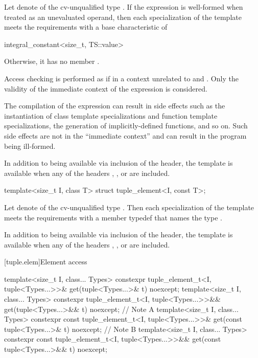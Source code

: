 \begin{itemdescr}
\pnum
Let  denote  of the cv-unqualified type .
If the expression  is well-formed
when treated as an unevaluated operand, then
each specialization of the template meets the  requirements
with a base characteristic of
\begin{codeblock}
integral_constant<size_t, TS::value>
\end{codeblock}
Otherwise, it has no member .

\pnum
Access checking is performed as if in a context
unrelated to  and .
Only the validity of the immediate context of the expression is considered.
\begin{note}
The compilation of the expression can result in side effects
such as the instantiation of class template specializations and
function template specializations, the generation of implicitly-defined functions, and so on.
Such side effects are not in the ``immediate context'' and
can result in the program being ill-formed.
\end{note}

\pnum
In addition to being available via inclusion of the  header,
the template is available
when any of the headers
,
, or
are included.
\end{itemdescr}

%
\begin{itemdecl}
template<size_t I, class T> struct tuple_element<I, const T>;
\end{itemdecl}

\begin{itemdescr}
\pnum
Let  denote  of the cv-unqualified type . Then
each specialization of the template meets the  requirements
with a member typedef  that names the type .

\pnum
In addition to being available via inclusion of the  header,
the template is available
when any of the headers
,
, or
are included.
\end{itemdescr}

[tuple.elem]{Element access}

%
\begin{itemdecl}
template<size_t I, class... Types>
  constexpr tuple_element_t<I, tuple<Types...>>&
    get(tuple<Types...>& t) noexcept;
template<size_t I, class... Types>
  constexpr tuple_element_t<I, tuple<Types...>>&&
    get(tuple<Types...>&& t) noexcept;        // Note A
template<size_t I, class... Types>
  constexpr const tuple_element_t<I, tuple<Types...>>&
    get(const tuple<Types...>& t) noexcept;   // Note B
template<size_t I, class... Types>
  constexpr const tuple_element_t<I, tuple<Types...>>&& get(const tuple<Types...>&& t) noexcept;
\end{itemdecl}

